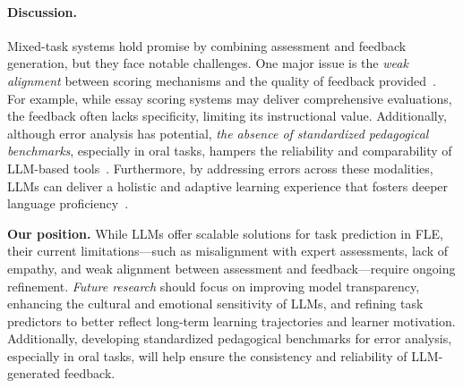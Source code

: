 

\paragraph{Discussion.} Mixed-task systems hold promise by combining assessment and feedback generation, but they face notable challenges. One major issue is the \textit{weak alignment} between scoring mechanisms and the quality of feedback provided~\cite{stahl2024exploring}. For example, while essay scoring systems may deliver comprehensive evaluations, the feedback often lacks specificity, limiting its instructional value. Additionally, although error analysis has potential, \textit{the absence of standardized pedagogical benchmarks}, especially in oral tasks, hampers the reliability and comparability of LLM-based tools~\cite{leu1982oral}. Furthermore, by addressing errors across these modalities, LLMs can deliver a holistic and adaptive learning experience that fosters deeper language proficiency~\cite{zhao2024embodied}.


\begin{tcolorbox}[top=1pt, bottom=1pt, left=1pt, right=1pt]
\textbf{Our position.} While LLMs offer scalable solutions for task prediction in FLE, their current limitations—such as misalignment with expert assessments, lack of empathy, and weak alignment between assessment and feedback—require ongoing refinement. \textit{Future research} should focus on improving model transparency, enhancing the cultural and emotional sensitivity of LLMs, and refining task predictors to better reflect long-term learning trajectories and learner motivation. Additionally, developing standardized pedagogical benchmarks for error analysis, especially in oral tasks, will help ensure the consistency and reliability of LLM-generated feedback.
\end{tcolorbox}
